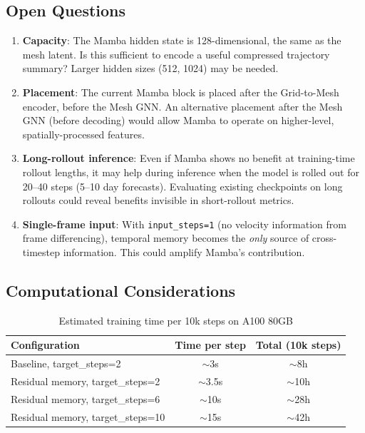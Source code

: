 \documentclass[11pt,a4paper]{article}
\begin{document}
\subsection{Open Questions}

\begin{enumerate}
    \item \textbf{Capacity}: The Mamba hidden state is 128-dimensional, the same as the mesh latent. Is this sufficient to encode a useful compressed trajectory summary? Larger hidden sizes (512, 1024) may be needed.

    \item \textbf{Placement}: The current Mamba block is placed after the Grid-to-Mesh encoder, before the Mesh GNN. An alternative placement after the Mesh GNN (before decoding) would allow Mamba to operate on higher-level, spatially-processed features.

    \item \textbf{Long-rollout inference}: Even if Mamba shows no benefit at training-time rollout lengths, it may help during inference when the model is rolled out for 20--40 steps (5--10 day forecasts). Evaluating existing checkpoints on long rollouts could reveal benefits invisible in short-rollout metrics.

    \item \textbf{Single-frame input}: With \texttt{input\_steps=1} (no velocity information from frame differencing), temporal memory becomes the \emph{only} source of cross-timestep information. This could amplify Mamba's contribution.
\end{enumerate}

\subsection{Computational Considerations}

\begin{table}[H]
\centering
\caption{Estimated training time per 10k steps on A100 80GB}
\begin{tabular}{lcc}
\toprule
Configuration & Time per step & Total (10k steps) \\
\midrule
Baseline, target\_steps=2 & $\sim$3s & $\sim$8h \\
Residual memory, target\_steps=2 & $\sim$3.5s & $\sim$10h \\
Residual memory, target\_steps=6 & $\sim$10s & $\sim$28h \\
Residual memory, target\_steps=10 & $\sim$15s & $\sim$42h \\
\bottomrule
\end{tabular}
\end{table}
\end{document}
